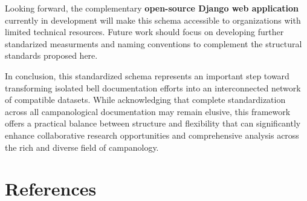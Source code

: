 \documentclass[11pt, a4paper]{article}
\begin{document}
Looking forward, the complementary \textbf{open-source Django web application} currently in development will make this schema accessible to organizations with limited technical resources. Future work should focus on developing further standarized measurments and naming conventions to complement the structural standards proposed here. 

In conclusion, this standardized schema represents an important step toward transforming isolated bell documentation efforts into an interconnected network of compatible datasets. While acknowledging that complete standardization across all campanological documentation may remain elusive, this framework offers a practical balance between structure and flexibility that can significantly enhance collaborative research opportunities and comprehensive analysis across the rich and diverse field of campanology.

\clearpage

\section{References}

\nocite{*}


\end{document}
